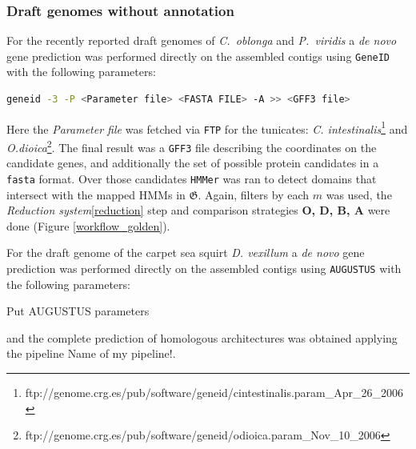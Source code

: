 \documentclass[11pt]{article}
\newcommand{\TODO}[1]{\begingroup\color{red}#1\endgroup}
\begin{document}
\subsubsection*{Draft genomes without annotation}

For the recently reported draft genomes of \textit{C.\ oblonga} and 
\textit{P.\ viridis} a \textit{de novo} gene prediction was performed 
directly on the assembled contigs using \texttt{GeneID}\cite{Blanco:2007} 
with the following parameters:

\begin{lstlisting}[language=bash, breaklines=true]
geneid -3 -P <Parameter file> <FASTA FILE> -A >> <GFF3 file>
\end{lstlisting}

Here the \textit{Parameter file} was fetched via \texttt{FTP} for the 
tunicates: \textsl{C. intestinalis}\footnote{
ftp://genome.crg.es/pub/software/geneid/cintestinalis.param\_Apr\_26\_2006} and 
\textsl{O.dioica}\footnote{
ftp://genome.crg.es/pub/software/geneid/odioica.param\_Nov\_10\_2006}. The final 
result was a \texttt{GFF3} file describing the coordinates on the candidate 
genes, and additionally the set of possible protein candidates in a 
\texttt{fasta} format. Over those candidates \texttt{HMMer} was ran to detect 
domains that intersect with the mapped HMMs in $\boldsymbol{\mathfrak{G}}$. 
Again, filters by each $m$ was used, the \textsl{Reduction 
system}\ref{reduction} step and comparison strategies \textbf{O, D, B, A} were 
done (Figure \ref{workflow_golden}).

For the draft genome of the carpet sea squirt \textit{D. vexillum} 
\cite{velandia2016a} a \textit{de novo} gene prediction was performed 
directly on the assembled contigs using \texttt{AUGUSTUS} \cite{augustus} 
with the following parameters:

\TODO{Put AUGUSTUS parameters}

and the complete prediction of homologous architectures was obtained applying 
the pipeline \TODO{Name of my pipeline!}.
\end{document}
